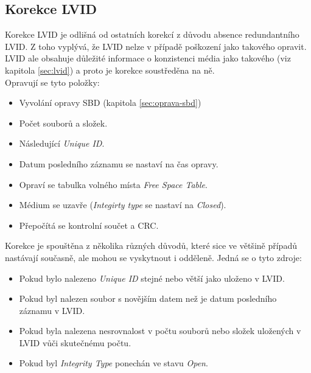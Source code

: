 \subsection{Korekce LVID}
\label{sec:oprava-lvid}
Korekce LVID je odlišná od ostatních korekcí z důvodu absence redundantního LVID. Z toho vyplývá, že LVID nelze v případě poškození jako takového opravit. LVID ale obsahuje důležité informace o konzistenci média jako takového (viz kapitola \ref{sec:lvid}) a proto je korekce soustředěna na ně.\\
Opravují se tyto položky:
\begin{itemize}
    \item Vyvolání opravy SBD (kapitola \ref{sec:oprava-sbd})
    \item Počet souborů a složek.
    \item Následující \textit{Unique ID}.
    \item Datum posledního záznamu se nastaví na čas opravy.
    \item Opraví se tabulka volného místa \textit{Free Space Table}.
    \item Médium se uzavře (\textit{Integirty type} se nastaví na \textit{Closed}).
    \item Přepočítá se kontrolní součet a CRC.
\end{itemize}
Korekce je spouštěna z několika různých důvodů, které sice ve většině případů nastávají současně, ale mohou se vyskytnout i odděleně. Jedná se o tyto zdroje:
\begin{itemize}
    \item Pokud bylo nalezeno \textit{Unique ID} stejné nebo větší jako uloženo v LVID.
    \item Pokud byl nalezen soubor s novějším datem než je datum posledního záznamu v LVID.
    \item Pokud byla nalezena nesrovnalost v počtu souborů nebo složek uložených v LVID vůči skutečnému počtu.
    \item Pokud byl \textit{Integrity Type} ponechán ve stavu \textit{Open}.
\end{itemize}

